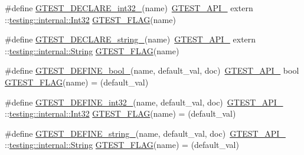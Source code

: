 \begin{DoxyCompactItemize}
$$\#define \hyperlink{gtest-port_8h_aab2ee98cb616054b1d3a7dc71efe81fc}{\-G\-T\-E\-S\-T\-\_\-\-D\-E\-C\-L\-A\-R\-E\-\_\-int32\-\_\-}(name)~\hyperlink{gtest-port_8h_aa73be6f0ba4a7456180a94904ce17790}{\-G\-T\-E\-S\-T\-\_\-\-A\-P\-I\-\_\-} extern \-::\hyperlink{namespacetesting_1_1internal_a8d84339888eecdb29b3d8f7607af3ecc}{testing\-::internal\-::\-Int32} \hyperlink{gtest__output__test___8cc_a448e05d56107d7550bea141e0f7a73d3}{\-G\-T\-E\-S\-T\-\_\-\-F\-L\-A\-G}(name)
\item 
\#define \hyperlink{gtest-port_8h_a9f74eee05f7ee5534139a622fe7da7dd}{\-G\-T\-E\-S\-T\-\_\-\-D\-E\-C\-L\-A\-R\-E\-\_\-string\-\_\-}(name)~\hyperlink{gtest-port_8h_aa73be6f0ba4a7456180a94904ce17790}{\-G\-T\-E\-S\-T\-\_\-\-A\-P\-I\-\_\-} extern \-::\hyperlink{classtesting_1_1internal_1_1String}{testing\-::internal\-::\-String} \hyperlink{gtest__output__test___8cc_a448e05d56107d7550bea141e0f7a73d3}{\-G\-T\-E\-S\-T\-\_\-\-F\-L\-A\-G}(name)
\item 
\#define \hyperlink{gtest-port_8h_a48e05814779e5a2f432b06a12618a760}{\-G\-T\-E\-S\-T\-\_\-\-D\-E\-F\-I\-N\-E\-\_\-bool\-\_\-}(name, default\-\_\-val, doc)~\hyperlink{gtest-port_8h_aa73be6f0ba4a7456180a94904ce17790}{\-G\-T\-E\-S\-T\-\_\-\-A\-P\-I\-\_\-} bool \hyperlink{gtest__output__test___8cc_a448e05d56107d7550bea141e0f7a73d3}{\-G\-T\-E\-S\-T\-\_\-\-F\-L\-A\-G}(name) = (default\-\_\-val)
\item 
\#define \hyperlink{gtest-port_8h_a88ee2f19589ffff86ca742fd33611358}{\-G\-T\-E\-S\-T\-\_\-\-D\-E\-F\-I\-N\-E\-\_\-int32\-\_\-}(name, default\-\_\-val, doc)~\hyperlink{gtest-port_8h_aa73be6f0ba4a7456180a94904ce17790}{\-G\-T\-E\-S\-T\-\_\-\-A\-P\-I\-\_\-} \-::\hyperlink{namespacetesting_1_1internal_a8d84339888eecdb29b3d8f7607af3ecc}{testing\-::internal\-::\-Int32} \hyperlink{gtest__output__test___8cc_a448e05d56107d7550bea141e0f7a73d3}{\-G\-T\-E\-S\-T\-\_\-\-F\-L\-A\-G}(name) = (default\-\_\-val)
\item 
\#define \hyperlink{gtest-port_8h_a885e18fe217a6e85553d408b99252c12}{\-G\-T\-E\-S\-T\-\_\-\-D\-E\-F\-I\-N\-E\-\_\-string\-\_\-}(name, default\-\_\-val, doc)~\hyperlink{gtest-port_8h_aa73be6f0ba4a7456180a94904ce17790}{\-G\-T\-E\-S\-T\-\_\-\-A\-P\-I\-\_\-} \-::\hyperlink{classtesting_1_1internal_1_1String}{testing\-::internal\-::\-String} \hyperlink{gtest__output__test___8cc_a448e05d56107d7550bea141e0f7a73d3}{\-G\-T\-E\-S\-T\-\_\-\-F\-L\-A\-G}(name) = (default\-\_\-val)
\end{DoxyCompactItemize}
